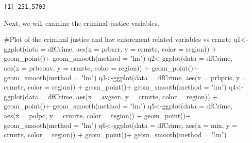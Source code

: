 \documentclass[]{article}
\newenvironment{Shaded}{}{}
\newcommand{\CommentTok}[1]{\textcolor[rgb]{0.00,0.50,0.00}{#1}}
\newcommand{\DataTypeTok}[1]{#1}
\newcommand{\KeywordTok}[1]{\textcolor[rgb]{0.00,0.00,1.00}{#1}}
\newcommand{\NormalTok}[1]{#1}
\newcommand{\OperatorTok}[1]{#1}
\newcommand{\StringTok}[1]{\textcolor[rgb]{0.00,0.50,0.50}{#1}}
\begin{document}
\begin{verbatim}
[1] 251.5703
\end{verbatim}

Next, we will examine the criminal justice variables.

\begin{Shaded}
\begin{Highlighting}[]
\CommentTok{#Plot of the criminal justice and law enforcment related variables vs crmrte}
\NormalTok{q1<-}\KeywordTok{ggplot}\NormalTok{(}\DataTypeTok{data =}\NormalTok{ dfCrime, }\KeywordTok{aes}\NormalTok{(}\DataTypeTok{x =}\NormalTok{ prbarr, }\DataTypeTok{y =}\NormalTok{ crmrte, }\DataTypeTok{color =}\NormalTok{ region)) }\OperatorTok{+}\StringTok{ }
\StringTok{      }\KeywordTok{geom_point}\NormalTok{()}\OperatorTok{+}
\StringTok{  }\KeywordTok{geom_smooth}\NormalTok{(}\DataTypeTok{method =} \StringTok{"lm"}\NormalTok{)}
\NormalTok{q2<-}\KeywordTok{ggplot}\NormalTok{(}\DataTypeTok{data =}\NormalTok{ dfCrime, }\KeywordTok{aes}\NormalTok{(}\DataTypeTok{x =}\NormalTok{ prbconv, }\DataTypeTok{y =}\NormalTok{ crmrte, }\DataTypeTok{color =}\NormalTok{ region)) }\OperatorTok{+}\StringTok{ }
\StringTok{      }\KeywordTok{geom_point}\NormalTok{()}\OperatorTok{+}
\StringTok{  }\KeywordTok{geom_smooth}\NormalTok{(}\DataTypeTok{method =} \StringTok{"lm"}\NormalTok{)}
\NormalTok{q3<-}\KeywordTok{ggplot}\NormalTok{(}\DataTypeTok{data =}\NormalTok{ dfCrime, }\KeywordTok{aes}\NormalTok{(}\DataTypeTok{x =}\NormalTok{ prbpris, }\DataTypeTok{y =}\NormalTok{ crmrte, }\DataTypeTok{color =}\NormalTok{ region)) }\OperatorTok{+}\StringTok{ }
\StringTok{      }\KeywordTok{geom_point}\NormalTok{()}\OperatorTok{+}
\StringTok{  }\KeywordTok{geom_smooth}\NormalTok{(}\DataTypeTok{method =} \StringTok{"lm"}\NormalTok{)}
\NormalTok{q4<-}\KeywordTok{ggplot}\NormalTok{(}\DataTypeTok{data =}\NormalTok{ dfCrime, }\KeywordTok{aes}\NormalTok{(}\DataTypeTok{x =}\NormalTok{ avgsen, }\DataTypeTok{y =}\NormalTok{ crmrte, }\DataTypeTok{color =}\NormalTok{ region)) }\OperatorTok{+}\StringTok{ }
\StringTok{      }\KeywordTok{geom_point}\NormalTok{()}\OperatorTok{+}
\StringTok{  }\KeywordTok{geom_smooth}\NormalTok{(}\DataTypeTok{method =} \StringTok{"lm"}\NormalTok{)}
\NormalTok{q5<-}\KeywordTok{ggplot}\NormalTok{(}\DataTypeTok{data =}\NormalTok{ dfCrime, }\KeywordTok{aes}\NormalTok{(}\DataTypeTok{x =}\NormalTok{ polpc, }\DataTypeTok{y =}\NormalTok{ crmrte, }\DataTypeTok{color =}\NormalTok{ region)) }\OperatorTok{+}\StringTok{ }
\StringTok{      }\KeywordTok{geom_point}\NormalTok{()}\OperatorTok{+}
\StringTok{  }\KeywordTok{geom_smooth}\NormalTok{(}\DataTypeTok{method =} \StringTok{"lm"}\NormalTok{)}
\NormalTok{q6<-}\KeywordTok{ggplot}\NormalTok{(}\DataTypeTok{data =}\NormalTok{ dfCrime, }\KeywordTok{aes}\NormalTok{(}\DataTypeTok{x =}\NormalTok{ mix, }\DataTypeTok{y =}\NormalTok{ crmrte, }\DataTypeTok{color =}\NormalTok{ region)) }\OperatorTok{+}\StringTok{ }
\StringTok{      }\KeywordTok{geom_point}\NormalTok{()}\OperatorTok{+}
\StringTok{  }\KeywordTok{geom_smooth}\NormalTok{(}\DataTypeTok{method =} \StringTok{"lm"}\NormalTok{)}


\end{Highlighting}
\end{Shaded}
\end{document}
